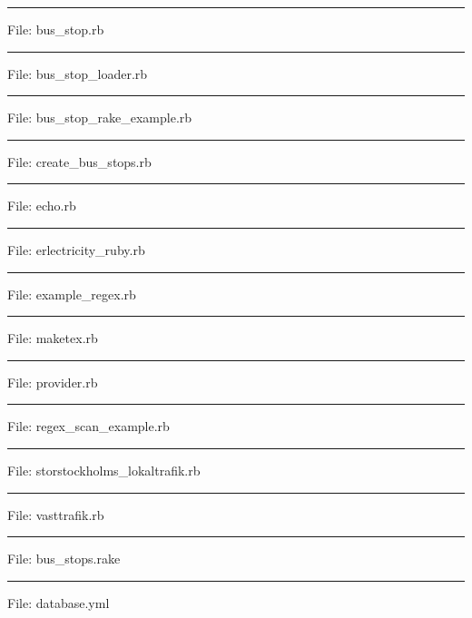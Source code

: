 \noindent
\rule{2cm}{0.5pt} File: bus\_stop.rb \hrulefill


\noindent
\rule{2cm}{0.5pt} File: bus\_stop\_loader.rb \hrulefill


\noindent
\rule{2cm}{0.5pt} File: bus\_stop\_rake\_example.rb \hrulefill


\noindent
\rule{2cm}{0.5pt} File: create\_bus\_stops.rb \hrulefill


\noindent
\rule{2cm}{0.5pt} File: echo.rb \hrulefill


\noindent
\rule{2cm}{0.5pt} File: erlectricity\_ruby.rb \hrulefill


\noindent
\rule{2cm}{0.5pt} File: example\_regex.rb \hrulefill


\noindent
\rule{2cm}{0.5pt} File: maketex.rb \hrulefill


\noindent
\rule{2cm}{0.5pt} File: provider.rb \hrulefill


\noindent
\rule{2cm}{0.5pt} File: regex\_scan\_example.rb \hrulefill


\noindent
\rule{2cm}{0.5pt} File: storstockholms\_lokaltrafik.rb \hrulefill


\noindent
\rule{2cm}{0.5pt} File: vasttrafik.rb \hrulefill


\noindent
\rule{2cm}{0.5pt} File: bus\_stops.rake \hrulefill


\noindent
\rule{2cm}{0.5pt} File: database.yml \hrulefill


